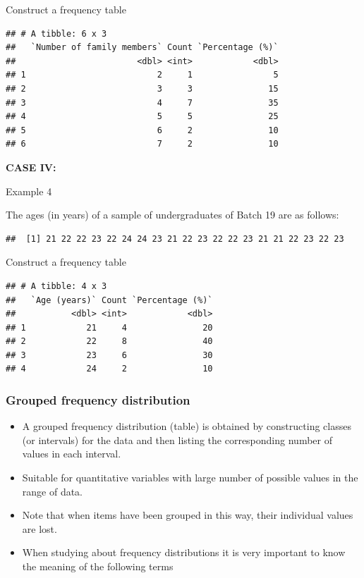 \documentclass[]{book}
\providecommand{\tightlist}{%
  \setlength{\itemsep}{0pt}\setlength{\parskip}{0pt}}
\begin{document}
Construct a frequency table

\begin{verbatim}
## # A tibble: 6 x 3
##   `Number of family members` Count `Percentage (%)`
##                        <dbl> <int>            <dbl>
## 1                          2     1                5
## 2                          3     3               15
## 3                          4     7               35
## 4                          5     5               25
## 5                          6     2               10
## 6                          7     2               10
\end{verbatim}

\textbf{CASE IV:}

Example 4

The ages (in years) of a sample of undergraduates of Batch 19 are as follows:

\begin{verbatim}
##  [1] 21 22 22 23 22 24 24 23 21 22 23 22 22 23 21 21 22 23 22 23
\end{verbatim}

Construct a frequency table

\begin{verbatim}
## # A tibble: 4 x 3
##   `Age (years)` Count `Percentage (%)`
##           <dbl> <int>            <dbl>
## 1            21     4               20
## 2            22     8               40
## 3            23     6               30
## 4            24     2               10
\end{verbatim}

\hypertarget{grouped-frequency-distribution}{%
\subsubsection{Grouped frequency distribution}\label{grouped-frequency-distribution}}

\begin{itemize}
\tightlist
\item
  A grouped frequency distribution (table) is obtained by constructing classes (or intervals) for the data and then listing the corresponding number of values in each interval.
\item
  Suitable for quantitative variables with large number of possible values in the range of data.
\item
  Note that when items have been grouped in this way, their individual values are lost.
\item
  When studying about frequency distributions it is very important to know the meaning of the following terms
\end{itemize}
\end{document}
